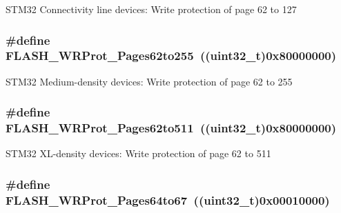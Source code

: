 \label{group__Option__Bytes__Write__Protection_ga346285408d8f738796fc22d710777ba9}
STM32 Connectivity line devices: Write protection of page 62 to 127 \hypertarget{group__Option__Bytes__Write__Protection_gacec4a825ff505ef5751ec6e5cf6d941e}{
\subsubsection[{FLASH\_\-WRProt\_\-Pages62to255}]{\setlength{\rightskip}{0pt plus 5cm}\#define FLASH\_\-WRProt\_\-Pages62to255~((uint32\_\-t)0x80000000)}}
\label{group__Option__Bytes__Write__Protection_gacec4a825ff505ef5751ec6e5cf6d941e}
STM32 Medium-\/density devices: Write protection of page 62 to 255 \hypertarget{group__Option__Bytes__Write__Protection_gab233da6081eaf5d664f16c0e8c7df138}{
\subsubsection[{FLASH\_\-WRProt\_\-Pages62to511}]{\setlength{\rightskip}{0pt plus 5cm}\#define FLASH\_\-WRProt\_\-Pages62to511~((uint32\_\-t)0x80000000)}}
\label{group__Option__Bytes__Write__Protection_gab233da6081eaf5d664f16c0e8c7df138}
STM32 XL-\/density devices: Write protection of page 62 to 511 \hypertarget{group__Option__Bytes__Write__Protection_ga124928d6134ddac13e3e8810a0d8dd1a}{
\subsubsection[{FLASH\_\-WRProt\_\-Pages64to67}]{\setlength{\rightskip}{0pt plus 5cm}\#define FLASH\_\-WRProt\_\-Pages64to67~((uint32\_\-t)0x00010000)}}
\label{group__Option__Bytes__Write__Protection_ga124928d6134ddac13e3e8810a0d8dd1a}
